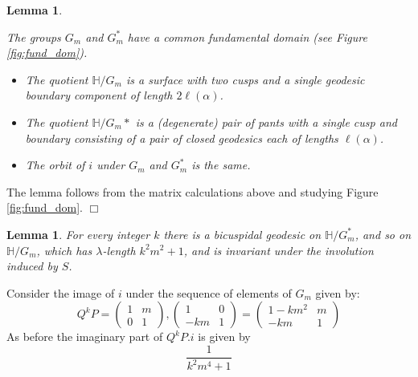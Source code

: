 \documentclass[12pt,a4paper]{amsart}
\newtheorem{lem}[thm]{Lemma}
\def\HH{\mathbb{H}}
\def\GG{G_m}
\begin{document}
\begin{lem}\label{pants}

The groups $\GG$ and $\GG^*$ have a common fundamental domain
 (see Figure \ref{fig:fund_dom}).
\begin{itemize}
\item
The quotient $\HH/\GG$ is a surface with two cusps and a single geodesic
boundary component of length $2\ell(\alpha)$.
\item
The quotient $\HH/\GG*$ is a 
(degenerate) pair of pants with a single cusp and boundary consisting of a pair
of closed geodesics each of lengths $\ell(\alpha)$.
\item The orbit of $i$ under $\GG$ and $\GG^*$ is the same.
\end{itemize}



\end{lem}

\proof The lemma follows from the matrix calculations above and studying Figure
\ref{fig:fund_dom}. \hfill $\Box$

\begin{lem}

	For every integer $k$ there is a bicuspidal geodesic on $\HH/\GG^*$,
	and so on $\HH/\GG$, which has $\lambda$-length $k^2 m^2 +1$, and is
	invariant under the  involution induced by $S$.

\end{lem}

 
\proof Consider the image of $i$ under the sequence of elements of $\GG$ given by:
$$ Q^kP = 
\begin{pmatrix} 1 & m \\ 0 & 1 \end{pmatrix},\begin{pmatrix} 1 & 0 \\ -km & 1 \end{pmatrix}  
= \begin{pmatrix} 1-km^2 & m \\ -km & 1 \end{pmatrix} $$
As before the imaginary part of $Q^kP.i$ is given by
$$\frac{1}{ k^2 m^4 + 1}$$
\end{document}
